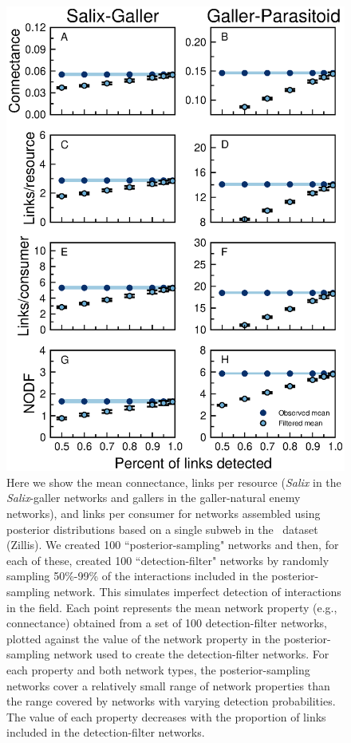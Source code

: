 \documentclass[12pt]{article}
\begin{document}
    \begin{figure}[ht]
    \caption{Here we show the mean connectance, links per resource (\emph{Salix} in the \emph{Salix}-galler networks and gallers in the galler-natural enemy networks), and links per consumer for networks assembled using posterior distributions based on a single subweb in the~\citet{Kopelke2017} dataset (Zillis). We created 100 ``posterior-sampling" networks and then, for each of these, created 100 ``detection-filter" networks by randomly sampling 50\%-99\% of the interactions included in the posterior-sampling network. This simulates imperfect detection of interactions in the field. Each point represents the mean network property (e.g., connectance) obtained from a set of 100 detection-filter networks, plotted against the value of the network property in the posterior-sampling network used to create the detection-filter networks. For each property and both network types, the posterior-sampling networks cover a relatively small range of network properties than the range covered by networks with varying detection probabilities. The value of each property decreases with the proportion of links included in the detection-filter networks.}
    \label{posterior_webs}    
    \includegraphics[width=.8\textwidth]{Figures/Salix_Galler_posterior_properties_Zillis.eps}
    \end{figure}



\clearpage

     
\end{document}

